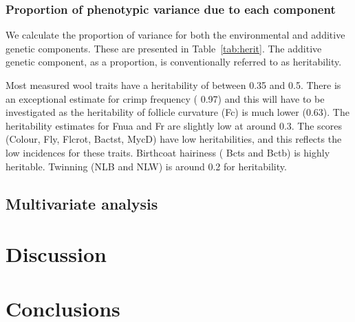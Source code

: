 \documentclass[titlepage]{article}  %
\begin{document}
\subsubsection{Proportion of phenotypic variance due to each component}
We calculate the proportion of variance for both the environmental and additive genetic components. These are presented in Table~\ref{tab:herit}. The additive genetic component, as a proportion, is conventionally referred to as heritability.

Most measured wool traits have a heritability of between 0.35 and 0.5. There is an exceptional estimate for crimp frequency ( 0.97) and this will have to be investigated as the heritability of follicle curvature  (Fc) is much lower (0.63). The heritability estimates for Fnua and Fr are slightly low at around 0.3. The scores (Colour, Fly, Flcrot, Bactst, MycD) have low heritabilities, and this reflects the low incidences for these traits. Birthcoat hairiness ( Bcts and Bctb) is highly heritable. Twinning (NLB and NLW) is around 0.2 for heritability.

\subsection{Multivariate analysis}


\section{Discussion}

\section{Conclusions}
\end{document}
